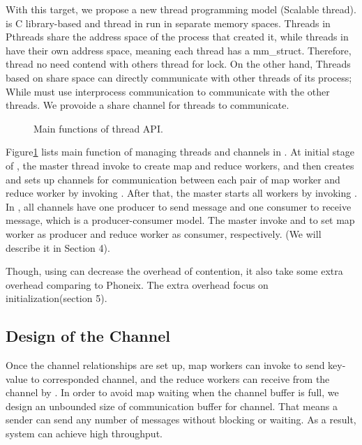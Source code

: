 With this target, we propose a new thread programming model \myth(Scalable thread).
\myth is C library-based and 
thread in \myth run in separate memory spaces.
Threads in Pthreads share the address space of the process that created it, 
while threads in \myth have their own address space,
meaning each thread has a mm\_struct.
Therefore, thread no need contend with others thread for lock.
On the other hand,
Threads based on share space can directly communicate with other threads of its process; 
While \myth must use interprocess communication to communicate with the other threads.
We provoide a share channel for threads to communicate.


\label{sec:pm:thread}
\begin{figure}[htpb]

\caption{Main functions of \myds thread API.}
\label{fig:api:thread}
\end{figure}

Figure\ref{fig:api:thread} lists main function of managing threads and channels in \myth.
At initial stage of \myds, the master thread invoke 
 to create map and reduce workers, 
and then creates and sets up channels for communication between each pair of map worker and reduce worker by invoking .
After that, the master starts all workers by invoking .
In \myds, all channels have one producer 
to send message and one consumer to receive message, 
which is a producer-consumer model.
The master invoke  and  
to set map worker as producer and reduce worker as consumer, respectively.
(We will describe it in Section 4). 

Though, using \myth can decrease the overhead of contention,
it also take some extra overhead comparing to Phoneix. 
The extra overhead focus on initialization(section 5). 


\subsection{Design of the Channel}
Once the channel relationships are set up, 
map workers can invoke  to send key-value to corresponded channel,
and the reduce workers can receive from the channel by .
In order to avoid map waiting when the channel buffer is full,
we design an unbounded size of communication buffer for channel.
That means a sender can send any number of messages without blocking or waiting.
As a result, system can achieve high throughput.


